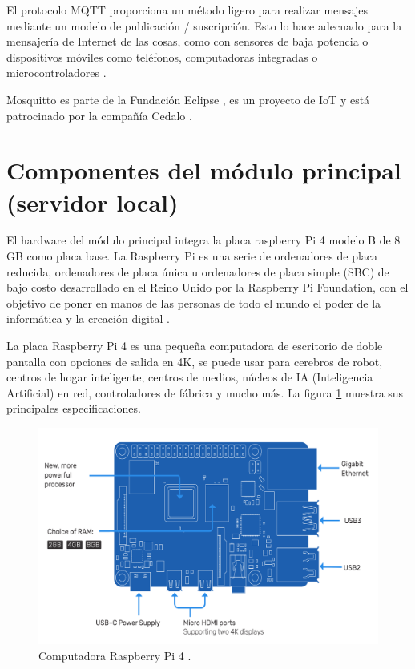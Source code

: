 El protocolo MQTT proporciona un método ligero para realizar mensajes mediante un modelo de publicación / suscripción. Esto lo hace adecuado para la mensajería de Internet de las cosas, como con sensores de baja potencia o dispositivos móviles como teléfonos, computadoras integradas o microcontroladores \citep{WEBSITE:5}.

Mosquitto es parte de la Fundación Eclipse \citep{WEBSITE:5}, es un proyecto de IoT \citep{WEBSITE:39} y está patrocinado por la compañía Cedalo \citep{WEBSITE:40}. 

\section{Componentes del módulo principal (servidor local)} 

El hardware del módulo principal integra la placa raspberry Pi 4 modelo B de 8 GB como placa base. La Raspberry Pi es una serie de ordenadores de placa reducida, ordenadores de placa única u ordenadores de placa simple (SBC) de bajo costo desarrollado en el Reino Unido por la Raspberry Pi Foundation, con el objetivo de poner en manos de las personas de todo el mundo el poder de la informática y la creación digital \citep{WEBSITE:6}.

La placa Raspberry Pi 4 es una pequeña computadora de escritorio de doble pantalla con opciones de salida en 4K, se puede usar para cerebros de robot, centros de hogar inteligente, centros de medios, núcleos de IA (Inteligencia Artificial) en red, controladores de fábrica y mucho más. La figura \ref{fig:rpi4} muestra sus principales especificaciones.

\vspace{0.5cm}

\begin{figure}[htbp]
	\centering
	\includegraphics[width=1.0\textwidth]{./Figures/rpi4.png}
	\caption{Computadora Raspberry Pi 4 \protect\footnotemark. \citep{WEBSITE:7}}

	\label{fig:rpi4}
\end{figure}

